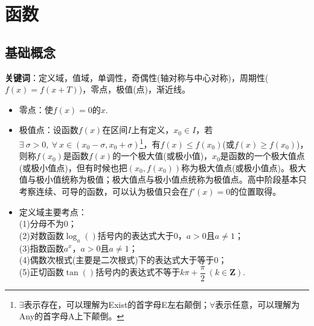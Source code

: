 \chapter{函数}

\section{基础概念}
\noindent \textbf{关键词}：定义域，值域，单调性，奇偶性(轴对称与中心对称)，周期性($ f(x)=f(x+T) $)，零点，极值(点)，渐近线。 

\begin{itemize}[leftmargin=\inteval{\myitemleftmargin}pt,itemsep=
   \inteval{\myitemitempsep}pt,topsep=\inteval{\myitemtopsep}pt]
\item 零点：使$ f(x)=0 $的$ x $. 
\item 极值点：设函数$ f(x) $在区间$ I $上有定义，$ x_0\in I $，若$ \exists\ \sigma>0,\ \forall\ x\in(x_0-\sigma,x_0+\sigma) $\footnote{$ \exists $表示存在，可以理解为Exist的首字母E左右颠倒；$ \forall $表示任意，可以理解为Any的首字母A上下颠倒。}，有$ f(x)\leq f(x_0) $(或$ f(x)\geq f(x_0) $)，则称$ f(x_0) $是函数$ f(x) $的一个极大值(或极小值)，$ x_0 $是函数的一个极大值点(或极小值点)，但有时候也把$ (x_0,f(x_0)) $称为极大值点(或极小值点)。极大值与极小值统称为极值；极大值点与极小值点统称为极值点。高中阶段基本只考察连续、可导的函数，可以认为极值只会在$ f'(x)=0 $的位置取得。

\item 定义域主要考点：\\
(1)分母不为0；\\
(2)对数函数$ \log_a() $括号内的表达式大于0，$a>0$且$ a\neq 1 $；\\
(3)指数函数$a^x$，$a>0$且$ a\neq 1 $；\\
(4)偶数次根式(主要是二次根式)下的表达式大于等于0；\\
(5)正切函数$ \tan() $括号内的表达式不等于$ k\pi+\dfrac{\pi}{2}\ 
(k\in \mathbf{Z}) $. 

\end{itemize}

